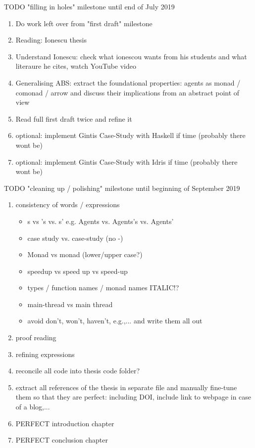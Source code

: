 \documentclass[oneside]{book}
\begin{document}
TODO "filling in holes" milestone until end of July 2019
\begin{enumerate}
	\item Do work left over from "first draft" milestone
	
	\item Reading: Ionescu thesis
	
	\item Understand Ionescu: check what ionescou wants from his students and what literaure he cites, watch YouTube video
	
	\item Generalising ABS: extract the foundational properties: agents as monad / comonad / arrow and discuss their implications from an abstract point of view

	\item Read full first draft twice and refine it
	
	\item optional: implement Gintis Case-Study with Haskell if time (probably there wont be)
	\item optional: implement Gintis Case-Study with Idris if time (probably there wont be)
\end{enumerate}

TODO "cleaning up / polishing" milestone until beginning of September 2019
\begin{enumerate}
	\item consistency of words / expressions
		\begin{itemize}
			\item s vs 's vs. s' e.g. Agents vs. Agents's vs. Agents'
			\item case study vs. case-study (no -)
			\item Monad vs monad (lower/upper case?)
			\item speedup vs speed up vs speed-up
			\item types / function names / monad names ITALIC!?
			\item main-thread vs main thread
			\item avoid don't, won't, haven't, e.g.,... and write them all out
		\end{itemize}
	\item proof reading

	\item refining expressions
	
	\item reconcile all code into thesis code folder?
	
	\item extract all references of the thesis in separate file and manually fine-tune them so that they are perfect: including DOI, include link to webpage in case of a blog,...
	
	\item PERFECT introduction chapter
	
	\item PERFECT conclusion chapter
\end{enumerate}
\end{document}
